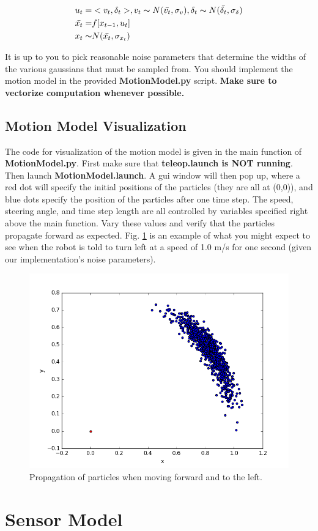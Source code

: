 \documentclass[final]{article}
\begin{document}
\begin{align*}
u_t =& <v_t, \delta_t>, v_t \thicksim N(\bar{v_t},\sigma_v), \delta_t \thicksim N(\bar{\delta_t}, \sigma_{\delta}) \\
\bar{x_t} =& f[x_{t-1},u_t] \\
x_t \thicksim & N(\bar{x_t}, \sigma_{x_t})
\end{align*}

It is up to you to pick reasonable noise parameters that determine the widths of the various gaussians that must be sampled from. You should implement the motion model in the provided \textbf{MotionModel.py} script. \textbf{Make sure to vectorize computation whenever possible.}

\subsection{Motion Model Visualization}
The code for visualization of the motion model is given in the main function of \textbf{MotionModel.py}. First make sure that \textbf{teleop.launch is NOT running}. Then launch \textbf{MotionModel.launch}. A gui window will then pop up, where a red dot will specify the initial positions of the particles (they are all at (0,0)), and blue dots specify the position of the particles after one time step. The speed, steering angle, and time step length are all controlled by variables specified right above the main function. Vary these values and verify that the particles propagate forward as expected. Fig. \ref{fig:motion_model} is an example of what you might expect to see when the robot is told to turn left at a speed of 1.0 m/s for one second (given our implementation's noise parameters).

\begin{figure}[h]
\centering
\includegraphics[width=0.45\linewidth]{figs/motion_model.png}
\caption{Propagation of particles when moving forward and to the left.}
\label{fig:motion_model}
\end{figure}

\section{Sensor Model}
\end{document}
